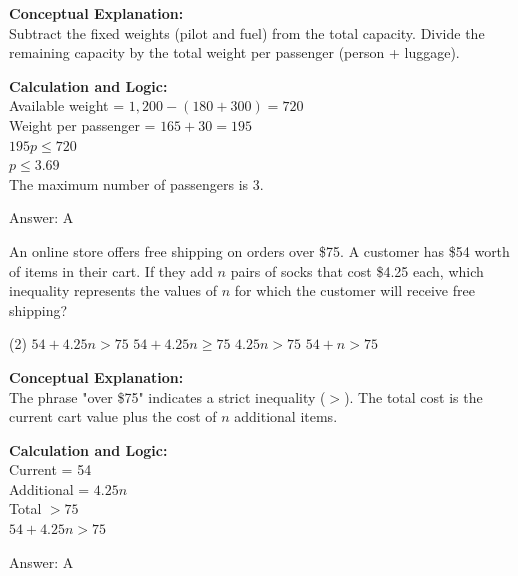 \documentclass[11pt,paper=a4,answers]{exam}
\begin{document}
\begin{questions}
\begin{solution}
\textbf{Conceptual Explanation:} \\
Subtract the fixed weights (pilot and fuel) from the total capacity. Divide the remaining capacity by the total weight per passenger (person + luggage).

\vspace{10pt}
\textbf{Calculation and Logic:} \\
Available weight = $1,200 - (180 + 300) = 720$ \\
Weight per passenger = $165 + 30 = 195$ \\
$195p \le 720$ \\
$p \le 3.69$ \\
The maximum number of passengers is 3.

\vspace{15pt}
Answer: \colorbox{yellow!100}{A}
\end{solution}

\vspace{20pt}

\question
An online store offers free shipping on orders over \$75. A customer has \$54 worth of items in their cart. If they add $n$ pairs of socks that cost \$4.25 each, which inequality represents the values of $n$ for which the customer will receive free shipping?
\begin{tasks}(2)
    \task $54 + 4.25n > 75$
    \task $54 + 4.25n \ge 75$
    \task $4.25n > 75$
    \task $54 + n > 75$
\end{tasks}

\begin{solution}
\textbf{Conceptual Explanation:} \\
The phrase "over \$75" indicates a strict inequality ($>$). The total cost is the current cart value plus the cost of $n$ additional items.

\vspace{10pt}
\textbf{Calculation and Logic:} \\
Current = 54 \\
Additional = $4.25n$ \\
Total $> 75$ \\
$54 + 4.25n > 75$

\vspace{15pt}
Answer: \colorbox{yellow!100}{A}
\end{solution}



\end{questions}
\end{document}
